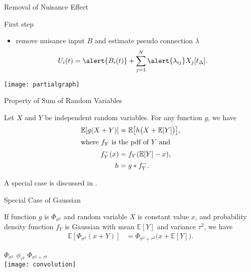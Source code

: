 \documentclass[fleqn,aspectratio=1610]{beamer}
\begin{document}
\begin{frame}[label={sec:orgeff6cf5}]{Removal of Nuisance Effect}
\begin{block}{First step}
\begin{itemize}
\item remove nuisance input \(B\) and estimate pseudo connection \(\lambda\)
\begin{align}
  U_i(t)
  &= \alert{B_i(t)} +
    \sum_{j=1}^{N} \alert{\lambda_{ij}} X_j[t_\Delta].
\end{align}
\end{itemize}
\end{block}
\begin{center}
\texttt{[image: partialgraph]}
\end{center}
\end{frame}


\begin{frame}[label={sec:orgcbd4eae}]{Property of Sum of Random Variables}
\begin{theorem}[]\label{sec:org167c925}
Let \(X\) and \(Y\) be independent random variables.
For any function \(g\), we have
\begin{align}
  \mathbb{E}[g(X+Y)]
  &= \mathbb{E}\bigl[h\bigl(X+\mathbb{E}[Y]\bigr)\bigr],\\
  \intertext{where \(f_{Y}\) is the pdf of \(Y\) and}
  f^{-}_{Y}(x) &= f_Y(\mathbb{E}[Y]-x),\\
  h &= g*f^{-}_{Y}.
\end{align}
\end{theorem}
A special case is discussed in \cite{Hyvaerinen2002}.
\end{frame}

\begin{frame}[label={sec:org6461ef9}]{Special Case of Gaussian}
\begin{corollary}[]\label{sec:org8e60ce5}
If function \(g\) is \(\Phi_{\sigma^{2}}\)
and random variable \(X\) is constant value \(x\),
and probability density function \(f_Y\) is Gaussian
with mean \(\mathbb{E}[Y]\) and variance \(\tau^{2}\), we have
\begin{align}
  \mathbb{E}[\Phi_{\sigma^{2}}(x+Y)]
  &=\Phi_{\sigma^{2}+\tau^{2}}\bigl(x+\mathbb{E}[Y]\bigr).
\end{align}
\end{corollary}
\begin{center}
\(\Phi_{\sigma^{2}}\)\hspace{.29\linewidth}
\(\phi_{\tau^{2}}\)\hspace{.24\linewidth}
\(\Phi_{\sigma^{2}\!+\!\tau^{2}}\)\\[0pt]
\texttt{[image: convolution]}    
\end{center}
\end{frame}
\end{document}
